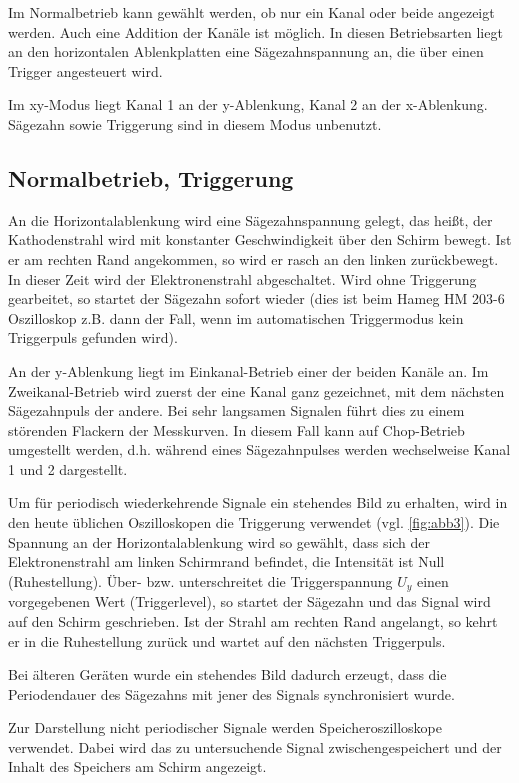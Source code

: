 \documentclass[11pt,ngerman]{scrartcl}
\begin{document}
Im Normalbetrieb kann gewählt werden, ob nur ein Kanal oder beide angezeigt werden. Auch eine
Addition der Kanäle ist möglich. In diesen Betriebsarten liegt an den horizontalen Ablenkplatten
eine Sägezahnspannung an, die über einen Trigger angesteuert wird.

Im xy-Modus liegt Kanal 1 an der y-Ablenkung, Kanal 2 an der x-Ablenkung. Sägezahn sowie
Triggerung sind in diesem Modus unbenutzt.



\subsection{Normalbetrieb, Triggerung}\label{sec:1_2}

An die Horizontalablenkung wird eine Sägezahnspannung gelegt, das heißt, der Kathodenstrahl
wird mit konstanter Geschwindigkeit über den Schirm bewegt. Ist er am rechten Rand angekommen,
so wird er rasch an den linken zurückbewegt. In dieser Zeit wird der Elektronenstrahl
abgeschaltet. Wird ohne Triggerung gearbeitet, so startet der Sägezahn sofort wieder (dies ist
beim Hameg HM 203-6 Oszilloskop z.B. dann der Fall, wenn im automatischen Triggermodus
kein Triggerpuls gefunden wird).

An der y-Ablenkung liegt im Einkanal-Betrieb einer der beiden Kanäle an. Im Zweikanal-Betrieb
wird zuerst der eine Kanal ganz gezeichnet, mit dem nächsten Sägezahnpuls der andere. Bei sehr
langsamen Signalen führt dies zu einem störenden Flackern der Messkurven. In diesem Fall kann
auf Chop-Betrieb umgestellt werden, d.h. während eines Sägezahnpulses werden wechselweise
Kanal 1 und 2 dargestellt.

Um für periodisch wiederkehrende Signale ein stehendes Bild zu erhalten, wird in den heute
üblichen Oszilloskopen die Triggerung verwendet (vgl. \autoref{fig:abb3}). Die Spannung an der Horizontalablenkung
wird so gewählt, dass sich der Elektronenstrahl am linken Schirmrand befindet,
die Intensität ist Null (Ruhestellung). Über- bzw. unterschreitet die Triggerspannung $U_y$ einen
vorgegebenen Wert (Triggerlevel), so startet der Sägezahn und das Signal wird auf den Schirm
geschrieben. Ist der Strahl am rechten Rand angelangt, so kehrt er in die Ruhestellung zurück
und wartet auf den nächsten Triggerpuls.

Bei älteren Geräten wurde ein stehendes Bild dadurch erzeugt, dass die Periodendauer des Sägezahns
mit jener des Signals synchronisiert wurde.

Zur Darstellung nicht periodischer Signale werden Speicheroszilloskope verwendet. Dabei wird
das zu untersuchende Signal zwischengespeichert und der Inhalt des Speichers am Schirm angezeigt.
\end{document}
